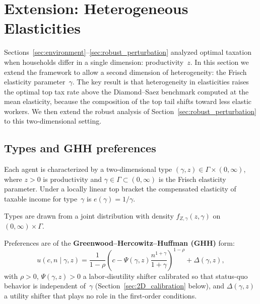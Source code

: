 \documentclass[12pt,a4paper]{article}
\theoremstyle{definition}
\theoremstyle{plain}
\theoremstyle{remark}
\begin{document}

\newpage
\section{Extension: Heterogeneous Elasticities}
\label{sec:2D}

Sections~\ref{sec:environment}--\ref{sec:robust_perturbation} analyzed optimal taxation when households differ in a single dimension: productivity~$z$.  In this section we extend the framework to allow a second dimension of heterogeneity: the Frisch elasticity parameter~$\gamma$.  The key result is that heterogeneity in elasticities raises the optimal top tax rate above the Diamond--Saez benchmark computed at the mean elasticity, because the composition of the top tail shifts toward less elastic workers.  We then extend the robust analysis of Section~\ref{sec:robust_perturbation} to this two-dimensional setting.

\subsection{Types and GHH preferences}
\label{sec:2D_types}

Each agent is characterized by a two-dimensional type $(\gamma,z) \in \Gamma \times (0,\infty)$, where $z > 0$ is productivity and $\gamma \in \Gamma \subset (0,\infty)$ is the Frisch elasticity parameter.  Under a locally linear top bracket the compensated elasticity of taxable income for type~$\gamma$ is $e(\gamma) = 1/\gamma$.

Types are drawn from a joint distribution with density $f_{Z,\gamma}(z,\gamma)$ on $(0,\infty) \times \Gamma$.

Preferences are of the \textbf{Greenwood--Hercowitz--Huffman (GHH)} form:
\begin{equation}
\label{eq:GHH_2D}
  u(c,n \mid \gamma,z)
  = \frac{1}{1-\rho}\left(c - \Psi(\gamma,z)\frac{n^{1+\gamma}}{1+\gamma}\right)^{1-\rho} + \Delta(\gamma,z),
\end{equation}
with $\rho > 0$, $\Psi(\gamma,z) > 0$ a labor-disutility shifter calibrated so that status-quo behavior is independent of~$\gamma$ (Section~\ref{sec:2D_calibration} below), and $\Delta(\gamma,z)$ a utility shifter that plays no role in the first-order conditions.
\end{document}
